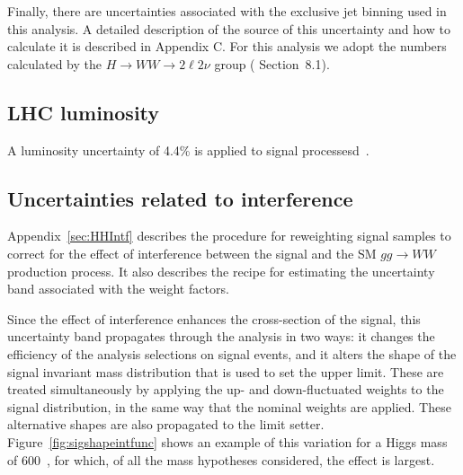 
Finally, there are uncertainties associated with the exclusive jet
binning used in this analysis. A detailed description of the source of
this uncertainty and how to calculate it is described in
\cite{cite:combine} Appendix C.  For this analysis we adopt the
numbers calculated by the $H\rightarrow WW\rightarrow 2\ell 2\nu$
group (\cite{cite:higgs2l2nu} Section~8.1).

\subsection{LHC luminosity}

A luminosity uncertainty of 4.4\% is applied to signal processesd~\cite{lumiPAS}.

\subsection{Uncertainties related to interference }

Appendix~\ref{sec:HHIntf} describes the procedure for reweighting
signal samples to correct for the effect of interference between the
signal and the SM $gg \to WW$ production process. It also describes
the recipe for estimating the uncertainty band associated with the
weight factors. 

Since the effect of interference enhances the cross-section of the
signal, this uncertainty band propagates through the analysis in two
ways: it changes the efficiency of the analysis selections on signal
events, and it alters the shape of the signal invariant mass
distribution that is used to set the upper limit. These are treated
simultaneously by applying the up- and down-fluctuated weights to the
signal distribution, in the same way that the nominal weights are
applied. These alternative shapes are also propagated to the limit setter.
Figure~\ref{fig:sigshapeintfunc} shows an example of this variation
for a Higgs mass of 600~\GeV, for which, of all the mass hypotheses
considered, the effect is largest.

